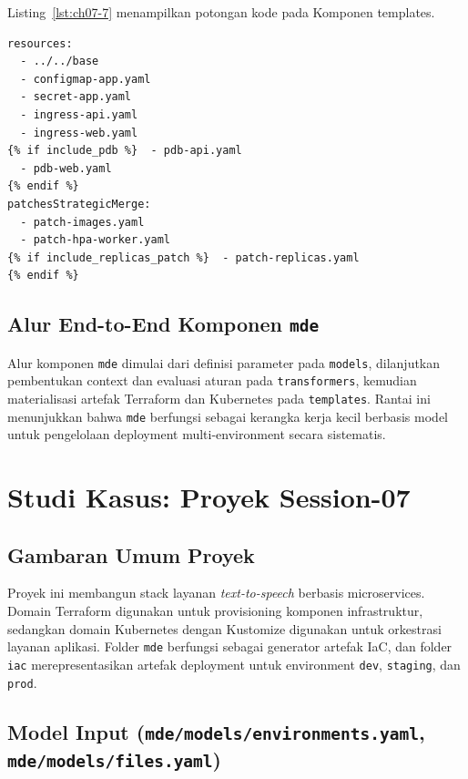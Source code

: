 Listing~\ref{lst:ch07-7} menampilkan potongan kode pada Komponen templates.
\begin{lstlisting}[style=PythonStyle,caption={Listing: Cuplikan template overlay (mde/templates/kubernetes/overlay/kustomization.yaml.j2)}, label={lst:ch07-7}]
resources:
  - ../../base
  - configmap-app.yaml
  - secret-app.yaml
  - ingress-api.yaml
  - ingress-web.yaml
{% if include_pdb %}  - pdb-api.yaml
  - pdb-web.yaml
{% endif %}
patchesStrategicMerge:
  - patch-images.yaml
  - patch-hpa-worker.yaml
{% if include_replicas_patch %}  - patch-replicas.yaml
{% endif %}
\end{lstlisting}

\subsection{Alur End-to-End Komponen \texttt{mde}}\label{subsec:mde-end-to-end}

Alur komponen \texttt{mde} dimulai dari definisi parameter pada \texttt{models}, dilanjutkan pembentukan context dan evaluasi aturan pada \texttt{transformers}, kemudian materialisasi artefak Terraform dan Kubernetes pada \texttt{templates}. Rantai ini menunjukkan bahwa \texttt{mde} berfungsi sebagai kerangka kerja kecil berbasis model untuk pengelolaan deployment multi-environment secara sistematis.

\section{Studi Kasus: Proyek Session-07}\label{sec:mde-studi-kasus}

\subsection{Gambaran Umum Proyek}\label{subsec:mde-gambaran-proyek}

Proyek ini membangun stack layanan \textit{text-to-speech} berbasis microservices. Domain Terraform digunakan untuk provisioning komponen infrastruktur, sedangkan domain Kubernetes dengan Kustomize digunakan untuk orkestrasi layanan aplikasi. Folder \texttt{mde} berfungsi sebagai generator artefak IaC, dan folder \texttt{iac} merepresentasikan artefak deployment untuk environment \texttt{dev}, \texttt{staging}, dan \texttt{prod}.

\subsection[Model Input]{Model Input (\texttt{mde/models/environments.yaml}, \texttt{mde/models/files.yaml})}\label{subsec:mde-model-input}

